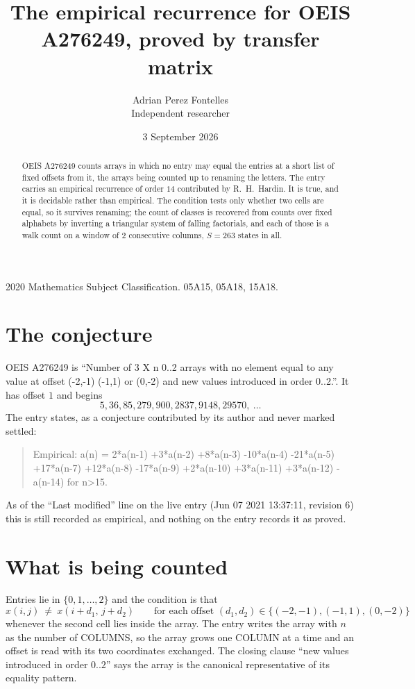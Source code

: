 \documentclass[11pt,a4paper]{article}
\title{The empirical recurrence for OEIS A276249, proved by transfer matrix}
\author{Adrian Perez Fontelles\\ \small Independent researcher}
\date{3 September 2026}
\theoremstyle{plain}
\theoremstyle{definition}
\begin{document}
\maketitle

\begin{abstract}
OEIS A276249 counts arrays in which no entry may equal the entries at a short list of fixed offsets
from it, the arrays being counted up to renaming the letters. The entry carries an empirical
recurrence of order $14$ contributed by R.~H.~Hardin. It is true, and it is decidable
rather than empirical. The condition tests only whether two cells are equal, so it survives
renaming; the count of classes is recovered from counts over fixed alphabets by inverting a
triangular system of falling factorials, and each of those is a walk count on a window of
$2$ consecutive columns, $S=263$ states in all.
\end{abstract}

\noindent\small 2020 Mathematics Subject Classification. 05A15, 05A18, 15A18.\normalsize

\section{The conjecture}

OEIS A276249 is ``Number of 3 X n 0..2 arrays with no element equal to any value at offset (-2,-1) (-1,1) or (0,-2) and new values introduced in order 0..2.''. It has offset $1$ and begins
\[
5, 36, 85, 279, 900, 2837, 9148, 29570,\ \dots
\]
The entry states, as a conjecture contributed by its author and never marked settled:
\begin{quote}
Empirical: a(n) = 2*a(n-1) +3*a(n-2) +8*a(n-3) -10*a(n-4) -21*a(n-5) +17*a(n-7) +12*a(n-8) -17*a(n-9) +2*a(n-10) +3*a(n-11) +3*a(n-12) -a(n-14) for n>15.
\end{quote}
As of the ``Last modified'' line on the live entry (Jun 07 2021 13:37:11, revision 6) this is still
recorded as empirical, and nothing on the entry records it as proved.

\section{What is being counted}

Entries lie in $\{0,1,\dots,2\}$ and the condition is that
\[
x(i,j)\ \ne\ x(i+d_1,\,j+d_2)\qquad\text{for each offset }(d_1,d_2)\in\{(-2,-1), (-1,1), (0,-2)\}
\]
whenever the second cell lies inside the array. The entry writes the array with $n$ as the number of COLUMNS, so the array grows one COLUMN at a time and an offset is read with its two coordinates exchanged. The closing clause ``new values
introduced in order $0..2$'' says the array is the canonical representative of its equality
pattern.
\end{document}
